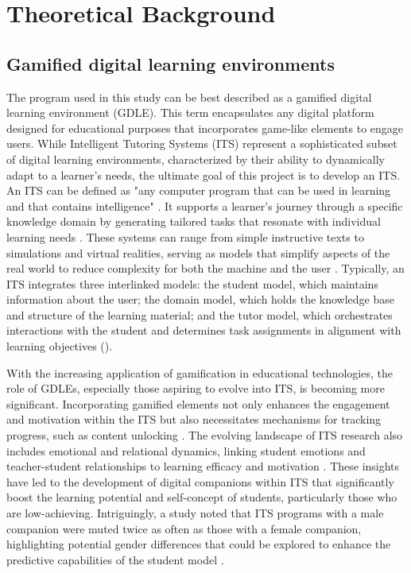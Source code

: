 \section{Theoretical Background}

\subsection{Gamified digital learning environments}
The program used in this study can be best described as a gamified digital learning environment (GDLE).
This term encapsulates any digital platform designed for educational purposes that incorporates game-like elements to engage users.
While Intelligent Tutoring Systems (ITS) represent a sophisticated subset of digital learning environments, characterized by their ability to dynamically adapt to a learner's needs, the ultimate goal of this project is to develop an ITS.
An ITS can be defined as "any computer program that can be used in learning and that contains intelligence" \parencite{freedmanLinksWhatIntelligent2000}.
It supports a learner’s journey through a specific knowledge domain by generating tailored tasks that resonate with individual learning needs \parencite{gonzalezGamificationIntelligentTutoring2014}.
These systems can range from simple instructive texts to simulations and virtual realities, serving as models that simplify aspects of the real world to reduce complexity for both the machine and the user \parencite{psotkaIntelligentTutoringSystems1988}.
Typically, an ITS integrates three interlinked models: the student model, which maintains information about the user; the domain model, which holds the knowledge base and structure of the learning material; and the tutor model, which orchestrates interactions with the student and determines task assignments in alignment with learning objectives (\cite{gonzalezGamificationIntelligentTutoring2014, freedmanLinksWhatIntelligent2000}).

With the increasing application of gamification in educational technologies, the role of GDLEs, especially those aspiring to evolve into ITS, is becoming more significant.
Incorporating gamified elements not only enhances the engagement and motivation within the ITS but also necessitates mechanisms for tracking progress, such as content unlocking \parencite{gonzalezGamificationIntelligentTutoring2014}.
The evolving landscape of ITS research also includes emotional and relational dynamics, linking student emotions and teacher-student relationships to learning efficacy and motivation \parencite{woolfAffectiveTutorsAutomatic2010}.
These insights have led to the development of digital companions within ITS that significantly boost the learning potential and self-concept of students, particularly those who are low-achieving.
Intriguingly, a study noted that ITS programs with a male companion were muted twice as often as those with a female companion, highlighting potential gender differences that could be explored to enhance the predictive capabilities of the student model \parencite{woolfAffectiveTutorsAutomatic2010}.


